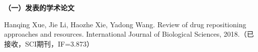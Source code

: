 
\begin{publication}
\noindent\textbf{（一）发表的学术论文}
\begin{publist}
\item	Hanqing Xue, Jie Li, Haozhe Xie, Yadong Wang. Review of drug repositioning approaches and resources. International Journal of Biological Sciences, 2018.（已接收，SCI期刊，IF=3.873）

\end{publist}

\end{publication}
